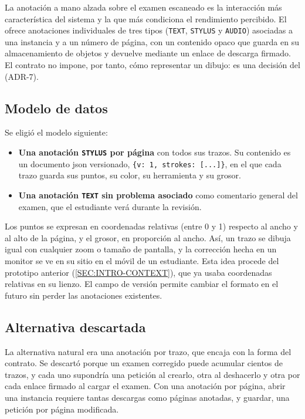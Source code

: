 La anotación a mano alzada sobre el examen escaneado es la interacción más característica
del sistema y la que más condiciona el rendimiento percibido. El  ofrece
anotaciones individuales de tres tipos (\texttt{TEXT}, \texttt{STYLUS} y \texttt{AUDIO})
asociadas a una instancia y a un número de página, con un contenido opaco que guarda en
su almacenamiento de objetos y devuelve mediante un enlace de descarga firmado. El
contrato no impone, por tanto, cómo representar un dibujo: es una decisión del
 (ADR-7).

\subsection{Modelo de datos}

Se eligió el modelo siguiente:
\begin{itemize}
  \item \textbf{Una anotación \texttt{STYLUS} por página} con todos sus trazos. Su contenido
        es un documento \acs{json} versionado, \texttt{\{v: 1, strokes: [...]\}}, en el que
        cada trazo guarda sus puntos, su color, su herramienta y su grosor.
  \item \textbf{Una anotación \texttt{TEXT} sin problema asociado} como comentario general
        del examen, que el estudiante verá durante la revisión.
\end{itemize}
Los puntos se expresan en coordenadas relativas (entre 0 y 1) respecto al ancho y al alto
de la página, y el grosor, en proporción al ancho. Así, un trazo se dibuja igual con
cualquier zoom o tamaño de pantalla, y la corrección hecha en un monitor se ve en su sitio
en el móvil de un estudiante. Esta idea procede del prototipo anterior
(\cref{SEC:INTRO-CONTEXT}), que ya usaba coordenadas relativas en su lienzo. El campo de
versión permite cambiar el formato en el futuro sin perder las anotaciones existentes.

\subsection{Alternativa descartada}

La alternativa natural era una anotación por trazo, que encaja con la forma del contrato.
Se descartó porque un examen corregido puede acumular cientos de trazos, y cada uno
supondría una petición al crearlo, otra al deshacerlo y otra por cada enlace firmado al
cargar el examen. Con una anotación por página, abrir una instancia requiere tantas
descargas como páginas anotadas, y guardar, una petición por página modificada.

